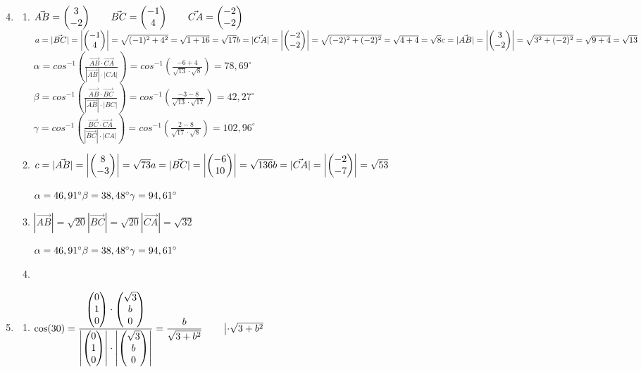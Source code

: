		\begin{enumerate}
		\setcounter{enumi}{3}
		\item 
		\begin{enumerate}
			\item	$\vec{AB}=\begin{pmatrix} 3 \\ -2 \end{pmatrix} \qquad \vec{BC}=\begin{pmatrix} -1 \\ 4 \end{pmatrix} \qquad \vec{CA}=\begin{pmatrix} -2 \\ -2 \end{pmatrix}$
			\bigskip\newline
			$  a=|\vec{BC}| = \left|\begin{pmatrix} -1 \\ 4 \end{pmatrix}\right| = \sqrt{(-1)^2+4^2} = \sqrt{1+16} = \sqrt{17}\\ b=|\vec{CA}|=\left|\begin{pmatrix} -2 \\ -2 \end{pmatrix}\right| = \sqrt{(-2)^2+(-2)^2} = \sqrt{4+4}=\sqrt{8}\\ 
			c=|\vec{AB}| = \left|\begin{pmatrix} 3 \\ -2 \end{pmatrix}\right| = \sqrt{3^2+(-2)^2} = \sqrt{9+4} =\sqrt{13}$\\
			\bigskip\newline
			$ \alpha = cos^{-1} \left(\frac{\vec{AB} \cdot \vec{CA}}{|\vec{AB}|\cdot |CA|}\right) = cos^{-1} \left(\frac{-6+4}{\sqrt{13} \cdot \sqrt{8}}\right) = 78\mathrm{,} 69^\circ $\\
			$ \beta = cos^{-1} \left(\frac{\vec{AB}\cdot\vec{BC}}{|\vec{AB}|\cdot|BC|}\right)=cos^{-1} \left(\frac{-3-8}{\sqrt{13}\cdot\sqrt{17}}\right) =42,27^\circ$\\
			$ \gamma = cos^{-1} \left(\frac{\vec{BC}\cdot\vec{CA}}{|\vec{BC}|\cdot|CA|}\right)=cos^{-1} \left(\frac{2-8}{\sqrt{17}\cdot\sqrt{8}}\right) =102,96^\circ $
			
			\item 
			$c= |\vec{AB}|=\left|\begin{pmatrix}  8 \\ -3 \end{pmatrix} \right|=\sqrt{73}\\
			 a= |\vec{BC}|=\left|\begin{pmatrix} -6 \\ 10 \end{pmatrix}\right|=\sqrt{136}\\
			 b= |\vec{CA}|=\left|\begin{pmatrix} -2 \\ -7 \end{pmatrix}\right|=\sqrt{53}$
			 
			$\alpha=46,91^\circ\\
			 \beta=38,48^\circ\\
			 \gamma=94,61^\circ$
			
			\item
			$|\vec{AB}|=\sqrt{20}
			 |\vec{BC}|=\sqrt{20}
			 |\vec{CA}|=\sqrt{32}$
			 
			 $\alpha=46,91^\circ\\
			 \beta=38,48^\circ\\
			 \gamma=94,61^\circ$
			 \item
		\end{enumerate}
		
		\bigskip
		\item 	
		\begin{enumerate}									
			\item	$\cos(30) =\dfrac{\begin{pmatrix} 0 \\ 1 \\ 0 \end{pmatrix} \cdot \begin{pmatrix} \sqrt{3} \\ b \\ 0 \end{pmatrix}} {\left|\begin{pmatrix} 0 \\ 1 \\ 0 \end{pmatrix}\right| \cdot \left|\begin{pmatrix} \sqrt{3} \\ b \\ 0 \end{pmatrix}\right|} = \dfrac{b}{\sqrt{3+b^2}}      \qquad \left|\cdot \sqrt{3+b^2}\right.$\\
			

\end{enumerate}
\end{enumerate}

